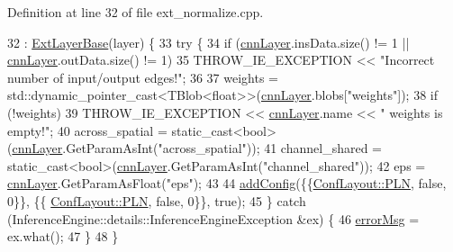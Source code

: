 Definition at line 32 of file ext\+\_\+normalize.\+cpp.


\begin{DoxyCode}
32                                                  : \hyperlink{classInferenceEngine_1_1Extensions_1_1Cpu_1_1ExtLayerBase_affff0e8263ca26852ccf71d299d7b06a}{ExtLayerBase}(layer) \{
33         \textcolor{keywordflow}{try} \{
34             \textcolor{keywordflow}{if} (\hyperlink{classInferenceEngine_1_1Extensions_1_1Cpu_1_1ExtLayerBase_a1074cdccacb9e9ca6eec01bbc2f7ca4a}{cnnLayer}.insData.size() != 1 || \hyperlink{classInferenceEngine_1_1Extensions_1_1Cpu_1_1ExtLayerBase_a1074cdccacb9e9ca6eec01bbc2f7ca4a}{cnnLayer}.outData.size() != 1)
35                 THROW\_IE\_EXCEPTION << \textcolor{stringliteral}{"Incorrect number of input/output edges!"};
36 
37             weights = std::dynamic\_pointer\_cast<TBlob<float>>(\hyperlink{classInferenceEngine_1_1Extensions_1_1Cpu_1_1ExtLayerBase_a1074cdccacb9e9ca6eec01bbc2f7ca4a}{cnnLayer}.blobs[\textcolor{stringliteral}{"weights"}]);
38             \textcolor{keywordflow}{if} (!weights)
39                 THROW\_IE\_EXCEPTION << \hyperlink{classInferenceEngine_1_1Extensions_1_1Cpu_1_1ExtLayerBase_a1074cdccacb9e9ca6eec01bbc2f7ca4a}{cnnLayer}.name << \textcolor{stringliteral}{" weights is empty!"};
40             across\_spatial = \textcolor{keyword}{static\_cast<}\textcolor{keywordtype}{bool}\textcolor{keyword}{>}(\hyperlink{classInferenceEngine_1_1Extensions_1_1Cpu_1_1ExtLayerBase_a1074cdccacb9e9ca6eec01bbc2f7ca4a}{cnnLayer}.GetParamAsInt(\textcolor{stringliteral}{"across\_spatial"}));
41             channel\_shared = \textcolor{keyword}{static\_cast<}\textcolor{keywordtype}{bool}\textcolor{keyword}{>}(\hyperlink{classInferenceEngine_1_1Extensions_1_1Cpu_1_1ExtLayerBase_a1074cdccacb9e9ca6eec01bbc2f7ca4a}{cnnLayer}.GetParamAsInt(\textcolor{stringliteral}{"channel\_shared"}));
42             eps = \hyperlink{classInferenceEngine_1_1Extensions_1_1Cpu_1_1ExtLayerBase_a1074cdccacb9e9ca6eec01bbc2f7ca4a}{cnnLayer}.GetParamAsFloat(\textcolor{stringliteral}{"eps"});
43 
44             \hyperlink{classInferenceEngine_1_1Extensions_1_1Cpu_1_1ExtLayerBase_a0ac7a6632e95b9500d5246b05b4b0bfa}{addConfig}(\{\{\hyperlink{classInferenceEngine_1_1Extensions_1_1Cpu_1_1ExtLayerBase_a1258a8d209e0249e0b1717618352ddfba446687ea2db1ada75be5ed053be77f59}{ConfLayout::PLN}, \textcolor{keyword}{false}, 0\}\}, \{\{
      \hyperlink{classInferenceEngine_1_1Extensions_1_1Cpu_1_1ExtLayerBase_a1258a8d209e0249e0b1717618352ddfba446687ea2db1ada75be5ed053be77f59}{ConfLayout::PLN}, \textcolor{keyword}{false}, 0\}\}, \textcolor{keyword}{true});
45         \} \textcolor{keywordflow}{catch} (InferenceEngine::details::InferenceEngineException &ex) \{
46             \hyperlink{classInferenceEngine_1_1Extensions_1_1Cpu_1_1ExtLayerBase_abc78e9b5a79fa339ffd831a5318f71f7}{errorMsg} = ex.what();
47         \}
48     \}
\end{DoxyCode}



